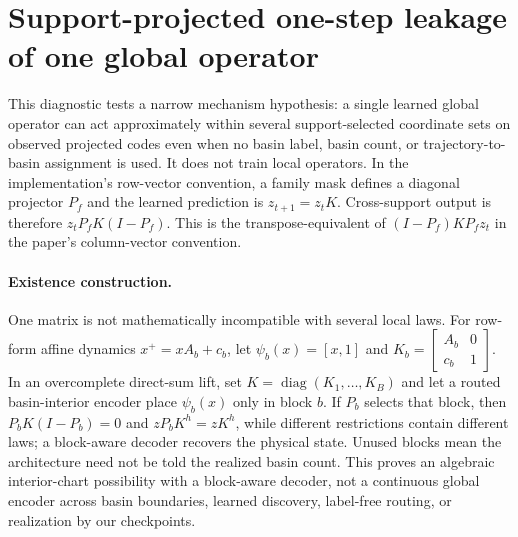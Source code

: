 \section{Support-projected one-step leakage of one global operator}
\label{app:global_k_support_closure}

This diagnostic tests a narrow mechanism hypothesis: a single learned global
operator can act approximately within several support-selected coordinate
sets on observed projected codes even when no basin label, basin count, or
trajectory-to-basin assignment is used.
It does not train local operators. In the implementation's row-vector
convention, a family mask defines a diagonal projector \(P_f\) and the learned
prediction is \(z_{t+1}=z_tK\). Cross-support output is therefore
\(z_tP_fK(I-P_f)\). This is the transpose-equivalent of
\((I-P_f)KP_fz_t\) in the paper's column-vector convention.

\paragraph{Existence construction.}
One matrix is not mathematically incompatible with several local laws. For
row-form affine dynamics $x^+=xA_b+c_b$, let
$\psi_b(x)=[x,1]$ and
$K_b=\left[\begin{smallmatrix}A_b&0\\c_b&1\end{smallmatrix}\right]$.
In an overcomplete direct-sum lift, set $K=\operatorname{diag}(K_1,\ldots,K_B)$
and let a routed basin-interior encoder place $\psi_b(x)$ only in block $b$. If $P_b$ selects that
block, then $P_bK(I-P_b)=0$ and $zP_bK^h=zK^h$, while different restrictions
contain different laws; a block-aware decoder recovers the physical state.
Unused blocks mean the architecture need not be told the realized basin count.
This proves an algebraic interior-chart possibility with a block-aware decoder,
not a continuous global encoder across basin boundaries, learned discovery,
label-free routing, or realization by our checkpoints.

